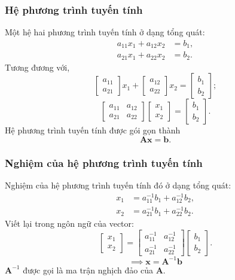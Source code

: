 \begin{frame}
    \frametitle{Hệ phương trình tuyến tính}
    Một hệ hai phương trình tuyến tính ở dạng tổng quát:
\begin{align*}
a_{11}x_{1} + a_{12}x_{2} &= b_{1}, \\
a_{21}x_{1} + a_{22}x_{2} &= b_{2}.
\end{align*}
Tương đương với,
\[\begin{bmatrix}
    a_{11}\\a_{21}
\end{bmatrix}x_{1}+\begin{bmatrix}
    a_{12}\\a_{22}
\end{bmatrix}x_{2}=\begin{bmatrix}
    b_{1}\\b_{2}
\end{bmatrix};\]
\[\begin{bmatrix}
    a_{11}&a_{12}\\
    a_{21}&a_{22}
\end{bmatrix}\begin{bmatrix}
    x_{1}\\x_{2}
\end{bmatrix}=\begin{bmatrix}
    b_{1}\\b_{2}
\end{bmatrix}.\]
Hệ phương trình tuyến tính được gói gọn thành 
\[\mathbf{A}\mathbf{x}=\mathbf{b}.\]
\end{frame}
\begin{frame}
    \frametitle{Nghiệm của hệ phương trình tuyến tính}
    Nghiệm của hệ phương trình tuyến tính đó ở dạng tổng quát:
    \begin{align*}
x_{1} &= a_{11}^{-1}b_{1} + a_{12}^{-1}b_{2}, \\
x_{2} &= a_{21}^{-1}b_{1} + a_{22}^{-1}b_{2}.
\end{align*}
Viết lại trong ngôn ngữ của vector:
\[\begin{bmatrix}
    x_{1}\\x_{2}
\end{bmatrix}=\begin{bmatrix}
    a_{11}^{-1}&a_{12}^{-1}\\
    a_{21}^{-1}&a_{22}^{-1}
\end{bmatrix}\begin{bmatrix}
    b_{1}\\b_{2}
\end{bmatrix}.\]
\[\implies \mathbf{x}=\mathbf{A}^{-1}\mathbf{b}\]
\(\mathbf{A}^{-1}\) được gọi là ma trận nghịch đảo của \(\mathbf{A}\).
\end{frame}
